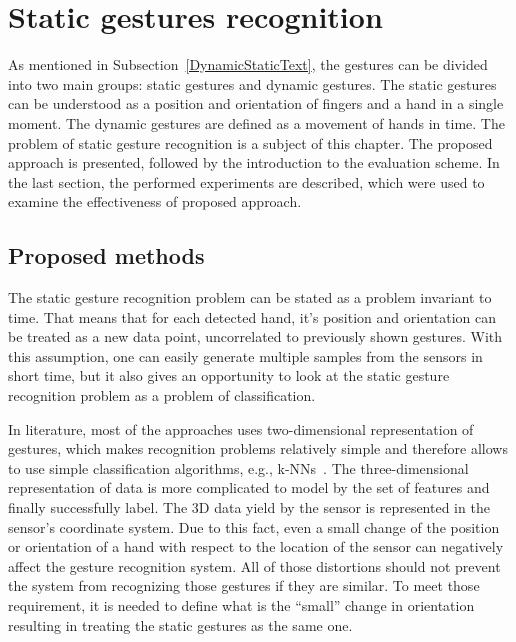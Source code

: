 
\chapter{Static gestures recognition}\label{staticChapter}

As mentioned in Subsection~\ref{DynamicStaticText}, the gestures can be divided into two main groups: static gestures and dynamic gestures.
The static gestures can be understood as a position and orientation of fingers and a hand in a single moment. The dynamic gestures are defined as a movement of hands in time. 
The problem of static gesture recognition is a subject of this chapter. 
The proposed approach is presented, followed by the introduction to the evaluation scheme. 
In the last section, the performed experiments are described, which were used to examine the effectiveness of proposed approach.

\section{Proposed methods}

The static gesture recognition problem can be stated as a problem invariant to time.
That means that for each detected hand, it's position and orientation can be treated as a new data point, uncorrelated to previously shown gestures.
With this assumption, one can easily generate multiple samples from the sensors in short time, but it also gives an opportunity to look at the static gesture recognition problem as a problem of classification.

In literature, most of the approaches uses two-dimensional representation of gestures, which makes recognition problems relatively simple and therefore allows to use simple classification algorithms, e.g., k-NNs~\cite{gestureRecognitionToolbox}. 
The three-dimensional representation of data is more complicated to model by the set of features and finally successfully label.
The 3D data yield by the sensor is represented in the sensor's coordinate system. 
Due to this fact, even a small change of the position or orientation of a hand with respect to the location of the sensor can negatively affect the gesture recognition system.
All of those distortions should not prevent the system from recognizing those gestures if they are similar.
To meet those requirement, it is needed to define what is the ``small'' change in orientation resulting in treating the static gestures as the same one.

